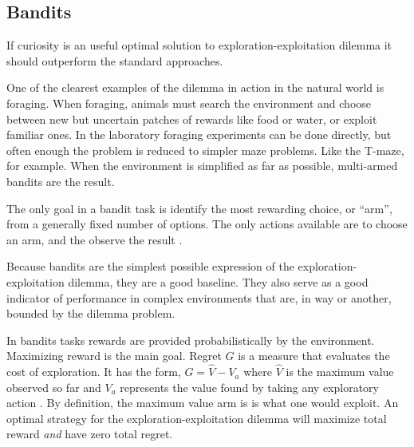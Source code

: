\documentclass[9pt,lineno]{elife}
\begin{document}

\subsection*{Bandits} 
If curiosity is an useful optimal solution to exploration-exploitation dilemma it should outperform the standard approaches.

One of the clearest examples of the dilemma in action in the natural world is foraging. When foraging, animals must search the environment and choose between new but uncertain patches of rewards like food or water, or exploit familiar ones. In the laboratory foraging experiments can be done directly, but often enough the problem is reduced to simpler maze problems. Like the T-maze, for example. When the environment is simplified as far as possible, multi-armed bandits are the result.

The only goal in a bandit task is identify the most rewarding choice, or ``arm'', from a generally fixed number of options. The only actions available are to choose an arm, and the observe the result \cite{Sutton2018}.
 
Because bandits are the simplest possible expression of the exploration-exploitation dilemma, they are a good baseline. They also serve as a good indicator of performance in complex environments that are, in way or another, bounded by the dilemma problem.
 
In bandits tasks rewards are provided probabilistically by the environment. Maximizing reward is the main goal. Regret $G$ is a measure that evaluates the cost of exploration. It has the form, $G = \hat V - V_a$ where $\hat V$ is the maximum value observed so far and $V_a$ represents the value found by taking any exploratory action \cite{Sutton2018}. By definition, the maximum value arm is is what one would exploit. An optimal strategy for the exploration-exploitation dilemma will maximize total reward \textit{and} have zero total regret.
\end{document}
